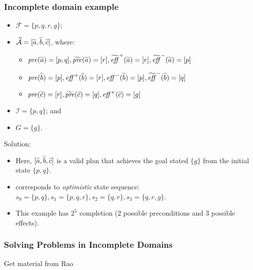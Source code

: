 \documentclass{beamer}
\newcommand{\todo}[1]{ {\color{red} #1} }
\begin{document}
\begin{frame}[c]\frametitle{Incomplete domain example}
\begin{itemize}
	\item $\mathcal{F} = \lbrace p,q,r,g \rbrace$;
	\item $\widetilde{\mathcal{\mathcal{A}}} = [ \widetilde{a},\widetilde{b},\widetilde{c} ]$, where:
	\begin{itemize}
		\item $\mathit{pre}(\widetilde{a}) = [ p,q ], \widetilde{\mathit{pre}}(\widetilde{a}) = [ r ], \widetilde{\mathit{eff}}^{+}(\widetilde{a}) = [ r ], \widetilde{\mathit{eff}}^{-}(\widetilde{a}) = [ p ]$
		\item $\mathit{pre}(\widetilde{b}) = [ p ], \mathit{eff}^{+}(\widetilde{b}) = [ r ], \mathit{eff}^{-}(\widetilde{b}) = [ p ], \widetilde{\mathit{eff}}^{-}(\widetilde{b}) = [ q ]$
		\item $\mathit{pre}(\widetilde{c}) = [ r ], \widetilde{\mathit{pre}}(\widetilde{c}) = [ q ], \mathit{eff}^{+}(\widetilde{c}) = [ g ]$
	\end{itemize}
	\item $\mathcal{I} = \lbrace p,q \rbrace$; and
	\item $G = \lbrace g \rbrace$.
\end{itemize}

Solution:
\begin{itemize}
	\item Here, $[\widetilde{a},\widetilde{b},\widetilde{c}]$ is a valid plan that achieves the goal stated $\lbrace g \rbrace$ from the initial state $\lbrace p,q \rbrace$.
	\item corresponds to  \textit{optimistic} state sequence:
	$s_{0} =  \lbrace p,q \rbrace, s_{1} = \lbrace p,q,r \rbrace, s_{2} = \lbrace q,r \rbrace, s_{3} = \lbrace q,r,g \rbrace$.
	\item This example has $2^{5}$ completion (2 possible preconditions and 3 possible effects).
\end{itemize}
\end{frame}

\begin{frame}[c]\frametitle{Solving Problems in Incomplete Domains}
	\todo{Get material from Rao}
\end{frame}
\end{document}
